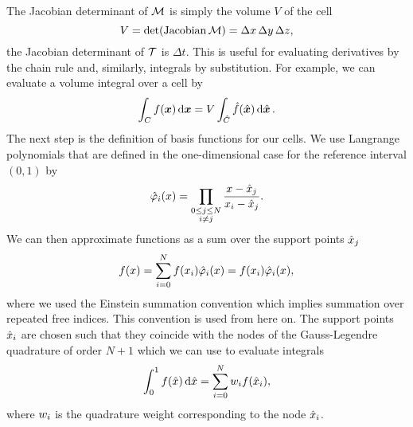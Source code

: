 The Jacobian determinant of $\mapping$ is simply the volume $V$ of the cell
\begin{equation}
  \label{eq:determinant-mapping}
  \volume = \operatorname{det}(\operatorname{Jacobian}\mapping) = \Delta x \, \Delta y \,\Delta z,
\end{equation}
the Jacobian determinant of $\timeMapping$ is $\Delta t$.
This is useful for evaluating derivatives by the chain rule and, similarly, integrals by substitution.
For example, we can evaluate a volume integral over a cell by
\begin{equation}
  \label{eq:integration-by-substitution}
  \intdcell{
f(\bm{x})
  }
  =
\volume \intdrefcell{
    \hat{f}(\hat{\bm{x}})
  }.
\end{equation}
The next step is the definition of basis functions for our cells.
We use Langrange polynomials that are defined in the one-dimensional case for the reference interval $(0,1)$ by
\begin{align}
  \label{eq:lagrange-basis}
    \lagrangeRef(x) = \prod_{\substack{0 \leq j \leq N \\ i \neq j}} \frac{x - {\quadNode[j]}}{x_i - \quadNode[j]}.
\end{align}
We can then approximate functions as a sum over the support points $\quadNode[j]$
\begin{equation}
  \label{eq:langrange-expansion-1d}
  f(x) = \sum_{i = 0}^N f(x_i) \lagrangeRef[i](x) = f(x_i) \lagrangeRef[i](x),
\end{equation}
where we used the Einstein summation convention which implies summation over repeated free indices.
This convention is used from here on.
The support points $\quadNode[i]$ are chosen such that they coincide with the nodes of the Gauss-Legendre quadrature of order $N+1$ which we can use to evaluate integrals
\begin{equation}
  \label{eq:quadrature-1d}
  \int_0^1 f(\hat{x}) \dd{\hat{x}} = \sum_{i=0}^{N} \quadWeight[i] f(\quadNode[i]),
\end{equation}
where $\quadWeight[i]$ is the quadrature weight corresponding to the node $\quadNode[i]$.

